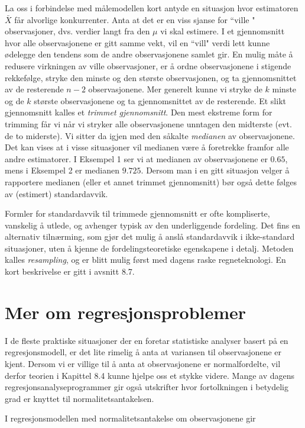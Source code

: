La oss i forbindelse med målemodellen kort antyde en
situasjon hvor estimatoren $\bar X$ får alvorlige
konkurrenter. Anta at det er en viss sjanse for ``ville "
observasjoner, dvs. verdier langt fra den $\mu$ vi skal estimere.
I et gjennomsnitt hvor alle observasjonene er gitt samme vekt,
vil en ``vill" verdi lett kunne ødelegge den tendens som de
andre observasjonene samlet gir. En mulig måte å redusere
virkningen av ville observasjoner, er å ordne observasjonene i
stigende rekkefølge, stryke den minste og den største
observasjonen, og ta gjennomsnittet av de resterende $n-2$
observasjonene. Mer generelt kunne vi stryke de $k$ minste og de
$k$ største observasjonene og ta gjennomsnittet av de
resterende. Et slikt gjennomsnitt kalles et {\em trimmet
gjennomsnitt}. Den mest ekstreme form for trimming får vi
når vi stryker alle observasjonene unntagen den midterste
(evt. de to miderste). Vi sitter da igjen med den såkalte
{\em medianen} av observasjonene. Det kan vises at i visse situasjoner
vil medianen være å foretrekke framfor alle andre
estimatorer. I Eksempel 1 ser vi at medianen av observasjonene er
$0.65$, mens i Eksempel 2 er medianen $9.725$. Dersom man i en gitt
situasjon velger å rapportere medianen (eller et annet
trimmet gjennomsnitt) bør også dette følges av
(estimert) standardavvik.

Formler for standardavvik til trimmede gjennomsnitt er ofte
kompli\-serte, vanskelig å utlede, og avhenger typisk av den
underliggende fordeling. Det fins en alternativ tilnærming,
som gjør det mulig å anslå standardavvik i ikke-standard
 situasjoner, uten å kjenne de fordelingsteoretiske egenskapene
i detalj. Metoden kalles {\em resampling}, og er blitt
mulig først med dagens raske regneteknologi.
En kort beskrivelse er gitt i avsnitt 8.7. 

\section{Mer om regresjonsproblemer}
I de fleste praktiske situasjoner der en foretar statistiske
analyser basert på en regresjonsmodell, er det lite rimelig
å anta at variansen til observasjonene er kjent. Dersom vi er
villige til å anta at observasjonene er normalfordelte, vil
derfor teorien i Kapittel 8.4 kunne hjelpe oss et stykke videre.
Mange av dagens regresjonsanalyseprogrammer gir også
utskrifter hvor fortolkningen i betydelig grad er knyttet til
normalitetsantakelsen. 

I regresjonsmodellen med normalitetsantakelse om observasjonene gir

